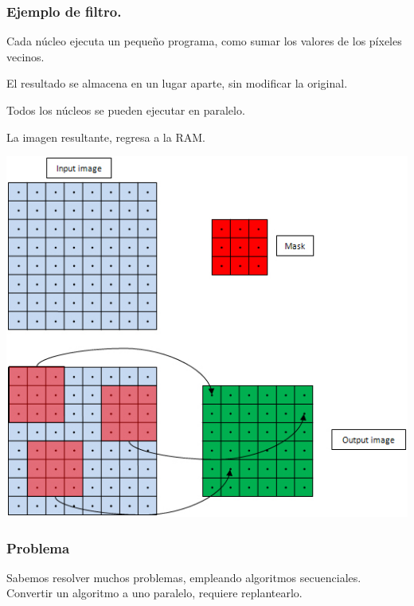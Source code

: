 \documentclass{beamer}
\begin{document}
\begin{frame}

\frametitle{Ejemplo de filtro.}

Cada núcleo ejecuta un pequeño programa, como sumar los valores
de los píxeles vecinos.

El resultado se almacena en un lugar aparte, sin modificar la original.

Todos los núcleos se pueden ejecutar en paralelo.

La imagen resultante, regresa a la RAM.

\end{frame}



\begin{frame}
\center
\includegraphics[width=\textheight]{convolucion.jpg}
\end{frame}



\begin{frame}
\frametitle{Problema}

Sabemos resolver muchos problemas, empleando algoritmos secuenciales.
Convertir un algoritmo a uno paralelo, requiere replantearlo.

\end{frame}
\end{document}
